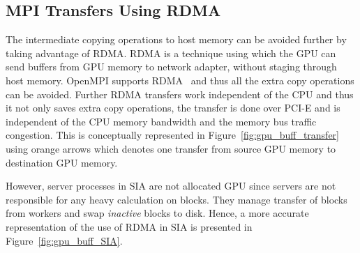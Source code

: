 \subsection{MPI Transfers Using RDMA}
The intermediate copying operations to host memory can be avoided further by
taking advantage of RDMA. RDMA is a technique using
which the GPU can send buffers from GPU memory to network adapter, without staging
through host memory. OpenMPI supports RDMA~\cite{openmpi-cudaaware} and thus all
the extra copy operations can be avoided.
Further RDMA transfers work independent of the CPU and thus it not only saves
extra copy operations, the transfer is done over PCI-E and is independent
of the CPU memory bandwidth and the memory bus traffic congestion.
This is conceptually represented in Figure~\ref{fig:gpu_buff_transfer} using orange
arrows which denotes one transfer from source GPU memory to destination GPU memory.

However, server processes in SIA are not allocated GPU since servers are not responsible
for any heavy calculation on blocks. They manage transfer of blocks from workers and
swap \textit{inactive} blocks to disk. Hence, a more accurate representation of
the use of RDMA in SIA is presented in Figure~\ref{fig:gpu_buff_SIA}.

